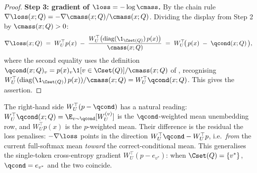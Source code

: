 \begin{proof}
\noindent\textbf{Step 3: gradient of $\loss = -\log \cmass$.}
By the chain rule $\nabla \loss(x; Q) = -\nabla \cmass(x; Q) / \cmass(x; Q)$.
Dividing the display from Step 2 by $\cmass(x; Q) > 0$:
\begin{align*}
   \nabla \loss(x; Q)
   \;=\; W_U^\top p(x) \;-\; \frac{W_U^\top \bigl(\mathrm{diag}(\1_{\Cset(Q)})\, p(x)\bigr)}{\cmass(x; Q)}
   \;=\; W_U^\top\!\bigl(\, p(x) \;-\; \qcond(x; Q) \,\bigr),
\end{align*}
where the second equality uses the definition
$\qcond(x; Q)_v = p(x)_v \1[v \in \Cset(Q)] / \cmass(x; Q)$ of
, recognising
$W_U^\top (\mathrm{diag}(\1_{\Cset(Q)})\, p(x)) / \cmass(x; Q)
= W_U^\top \qcond(x; Q)$. This gives the assertion.
\end{proof}

\begin{remark}\label{rem:gradient_form_reading}
The right-hand side $W_U^\top(p - \qcond)$ has a natural reading:
$W_U^\top \qcond(x; Q) = \E_{v \sim \qcond}[W_U^{(v)}]$ is the
$\qcond$-weighted mean unembedding row, and $W_U^\top p(x)$ is the
$p$-weighted mean. Their difference is the residual the loss penalises:
$-\nabla \loss$ points in the direction
$W_U^\top \qcond - W_U^\top p$, i.e.\ \emph{from} the current full-softmax
mean \emph{toward} the correct-conditional mean. This generalises the
single-token cross-entropy gradient $W_U^\top(p - e_{v^\ast})$: when
$\Cset(Q) = \{v^\ast\}$, $\qcond = e_{v^\ast}$ and the two coincide.
\end{remark}

